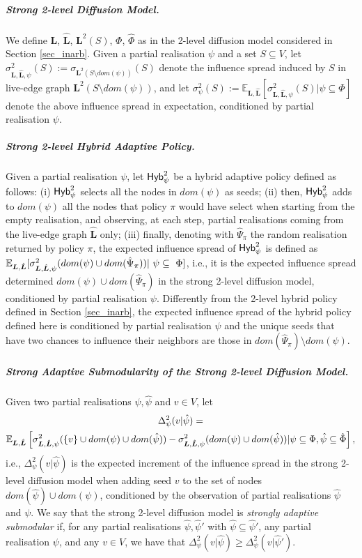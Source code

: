 \subparagraph*{Strong 2-level Diffusion Model.} We define $\bm L$, $\hat{\bm L}$, ${\bm L}^2(S)$, $\Phi$, $\hat{ \Phi}$ as in the 2-level diffusion model considered in Section \ref{sec_inarb}. Given a partial realisation $\psi$ and a set $S\subseteq V$, let $\sigma^{2}_{\bm L,\hat{\bm L},\psi}(S):=\sigma_{\bm L^2(S\setminus dom(\psi))}(S)$ denote the influence spread induced by $S$ in live-edge graph $\bm L^2(S\setminus dom(\psi))$, and let $\sigma^{2}_{\psi}(S):=\mathbb{E}_{\bm L,\hat{\bm L}}[\sigma^{2}_{\bm L,\hat{\bm L},\psi}(S)|\psi\subseteq \Phi]$ denote the above influence spread in expectation, conditioned by partial realisation $\psi$. 

\subparagraph*{Strong 2-level Hybrid Adaptive Policy.} Given a partial realisation $\psi$, let ${\sf Hyb}_\psi^2$ be a hybrid adaptive policy defined as follows: (i) ${\sf Hyb}_\psi^2$ selects all the nodes in $dom(\psi)$ as seeds; (ii) then, ${\sf Hyb}_\psi^2$ adds to $dom(\psi)$ all the nodes that policy $\pi$ would have select when starting from the empty realisation, and observing, at each step, partial realisations coming from the live-edge graph $\hat{\bm L}$ only; (iii) finally, denoting with $\hat{\Psi}_{\pi}$ the random realisation returned by policy $\pi$, the expected influence spread of ${\sf Hyb}_\psi^2$ is defined as $\mathbb{E}_{\bm L,\hat{\bm L}}[\sigma^{2}_{\bm L,\hat{\bm L},\psi}(dom(\psi)\cup dom(\hat{\Psi}_{\pi}))|~\psi\subseteq~\Phi]$, i.e., it is the expected influence spread determined $dom(\psi)\cup dom(\hat{\Psi}_{\pi})$ in the strong 2-level diffusion model, conditioned by partial realisation $\psi$. Differently from the 2-level hybrid policy defined in Section \ref{sec_inarb}, the expected influence spread of the hybrid policy defined here is conditioned by partial realisation $\psi$ and the unique seeds that have two chances to influence their neighbors are those in $dom(\hat{\Psi}_{\pi})\setminus dom(\psi)$.

\subparagraph*{Strong Adaptive Submodularity of the Strong 2-level Diffusion Model.}Given two partial realisations $\psi,\hat{\psi}$  and $v\in V$, let
\begin{multline*}
{\Delta}_{\psi}^2(v|\hat{\psi})=\nonumber\\
\mathbb{E}_{\bm L,\hat{\bm L}}\left[\sigma^{2}_{\bm L,\hat{\bm L},\psi}(\{v\}\cup dom(\psi)\cup dom(\hat{\psi}))-\sigma^{2}_{\bm L,\hat{\bm L},\psi}(dom(\psi)\cup dom(\hat{\psi}))|\psi\subseteq \Phi,\hat{\psi}\subseteq \hat{\Phi}\right],
\end{multline*}
i.e., $\Delta^2_\psi(v|\hat{\psi})$ is the expected increment of the influence spread in the strong 2-level diffusion model when adding seed $v$ to the set of nodes $dom(\hat{\psi})\cup dom(\psi)$, conditioned by the observation of partial realisations $\hat{\psi}$ and $\psi$. We say that the strong 2-level diffusion model is {\em strongly adaptive submodular} if, for any partial realisations $\hat{\psi},\hat{\psi}'$ with $\hat{\psi}\subseteq \hat{\psi}'$, any partial realisation $\psi$, and any $v\in V$, we have that $\Delta^2_\psi(v|\hat{\psi})\geq {\Delta}^2_\psi(v|\hat{\psi}')$. 

